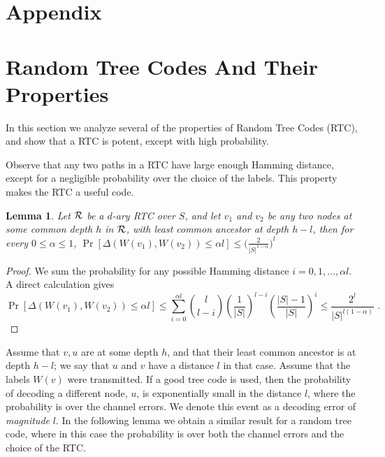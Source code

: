 \documentclass[ letterpaper, 11pt]{article}
\newtheorem{lemma}[theorem]{Lemma}
\newcommand{\RTBC}{\textsf{RTC}\xspace}
\newcommand{\tree}{{\cal R}}
\begin{document}








\appendix
\section*{Appendix}


\section{Random Tree Codes And Their Properties}\label{app:RTBC}
In this section we analyze several of the properties of Random Tree Codes (\RTBC), and show that
a \RTBC is potent, except with high probability.

Observe that any two paths in a \RTBC have large enough Hamming distance, except for  a
negligible probability over the choice of the labels. This property makes the \RTBC a useful code.
\begin{lemma}\label{lem:prob4smallHamming}
Let $\tree$ be a $d$-ary \RTBC over $S$,
and let $v_1$ and $v_2$ be any two nodes at some common depth $h$ in $\tree$,
with least common ancestor  at depth $h-l$, then for every $0\le\alpha\le1$,
$
\Pr \left[\Delta (W(v_1),W(v_2)) \le \alpha l \right] \le \Big(\frac{2}{|S|^{1-\alpha}}\Big)^l
$
\end{lemma}
\begin{proof}
We sum the probability for any possible Hamming distance $i=0,1,\ldots,\alpha l$. A direct calculation gives\\
\[
\Pr [\Delta (W(v_1),W(v_2)) \le \alpha l ] \le \sum_{i=0}^{\alpha l}{l \choose l-i} \left(\frac{1}{|S|}\right)^{l-i}\left(\frac{|S|-1}{|S|}\right)^{i}
\le  \frac{2^l}{|S|^{l(1-\alpha)}} \text{ .}
\]
\end{proof}\vspace{-0.5em}
Assume that $v, u$ are at some depth $h$,
and that their least common ancestor is at depth $h-l$;
we say that $u$ and $v$ have a distance $l$ in that case.
Assume that the labels $W(v)$ were transmitted.
If a good tree code is used, then the probability of decoding a different node, $u$, is
exponentially small in the distance $l$, where the probability is
over the channel errors. We denote this event as a
decoding error of \emph{magnitude} $l$.
In the following lemma we obtain a similar
result for a random tree code,
where in this case the probability is over both the channel errors and the choice of the \RTBC.
\end{document}
